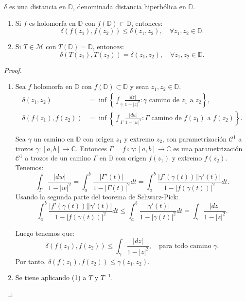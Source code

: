 $\delta$ es una distancia en $\mathbb{D}$, denominada distancia hiperbólica en $\mathbb{D}$.

\begin{proposition}
    \hfill
    \begin{enumerate}
        \item Si $f$ es holomorfa en $\mathbb{D}$ con $f(\mathbb{D}) \subset \mathbb{D}$, entonces:
              $$\delta(f(z_1), f(z_2)) \leq \delta(z_1, z_2), \quad \forall z_1, z_2 \in \mathbb{D}.$$
        \item Si $T \in \mathcal{M}$ con $T(\mathbb{D}) = \mathbb{D}$, entonces:
              $$\delta(T(z_1), T(z_2)) = \delta(z_1, z_2), \quad \forall z_1, z_2 \in \mathbb{D}.$$
    \end{enumerate}
\end{proposition}

\begin{proof}
    \hfill
    \begin{enumerate}
        \item Sea $f$ holomorfa en $\mathbb{D}$ con $f(\mathbb{D}) \subset \mathbb{D}$ y sean $z_1, z_2 \in \mathbb{D}$.
              \begin{align*}
                  \delta(z_1, z_2)       & = \inf \left\{\int_\gamma \frac{|dz|}{1-|z|^2} : \gamma \text{ camino de } z_1 \text{ a } z_2\right\},       \\
                  \delta(f(z_1), f(z_2)) & = \inf \left\{\int_\Gamma \frac{|dw|}{1-|w|^2} : \Gamma \text{ camino de } f(z_1) \text{ a } f(z_2)\right\}.
              \end{align*}

              Sea $\gamma$ un camino en $\mathbb{D}$ con origen $z_1$ y extremo $z_2$, con parametrización $\mathcal{C}^1$ a trozos $\gamma: [a, b] \to \mathbb{C}$.
              Entonces $\Gamma = f \circ \gamma: [a, b] \to \mathbb{C}$ es una parametrización $\mathcal{C}^1$ a trozos de un camino $\Gamma$ en $\mathbb{D}$ con origen $f(z_1)$ y extremo $f(z_2)$.
              Tenemos:
              $$\int_\Gamma \frac{|dw|}{1-|w|^2} = \int_a^b \frac{|\Gamma'(t)|}{1-|\Gamma(t)|^2}dt = \int_a^b \frac{|f'(\gamma(t))||\gamma'(t)|}{1-|f(\gamma(t))|^2}dt.$$
              Usando la segunda parte del teorema de Schwarz-Pick:
              $$\int_a^b \frac{|f'(\gamma(t))||\gamma'(t)|}{1-|f(\gamma(t))|^2}dt \leq \int_a^b \frac{|\gamma'(t)|}{1-|\gamma(t)|^2}dt = \int_\gamma \frac{|dz|}{1-|z|^2}.$$

              Luego tenemos que:
              $$\delta(f(z_1), f(z_2)) \leq \int_\gamma \frac{|dz|}{1-|z|^2}, \quad \text{para todo camino } \gamma.$$
              Por tanto, $\delta(f(z_1), f(z_2)) \leq \gamma(z_1, z_2)$.

        \item Se tiene aplicando (1) a $T$ y $T^{-1}$.
    \end{enumerate}
\end{proof}

